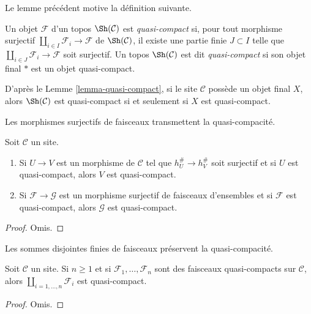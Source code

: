 \noindent
Le lemme précédent motive la définition suivante.

\begin{definition}
\label{definition-quasi-compact-topos}
Un objet $\mathcal{F}$ d’un topos $\Sh(\mathcal{C})$ est {\it quasi-compact}
si, pour tout morphisme surjectif $\coprod_{i \in I} \mathcal{F}_i \to \mathcal{F}$
de $\Sh(\mathcal{C})$, il existe une partie finie $J \subset I$ telle
que $\coprod_{i \in J} \mathcal{F}_i \to \mathcal{F}$ soit surjectif.
Un topos $\Sh(\mathcal{C})$ est dit {\it quasi-compact}
si son objet final $*$ est un objet quasi-compact.
\end{definition}

\noindent
D’après le Lemme \ref{lemma-quasi-compact},
si le site $\mathcal{C}$ possède un objet final $X$, alors
$\Sh(\mathcal{C})$ est quasi-compact si et seulement si $X$ est quasi-compact.

\begin{lemma}
\label{lemma-image-of-quasi-compact}
\begin{slogan}
Les morphismes surjectifs de faisceaux transmettent la quasi-compacité.
\end{slogan}
Soit $\mathcal{C}$ un site.
\begin{enumerate}
\item Si $U \to V$ est un morphisme de $\mathcal{C}$ tel que
$h_U^\# \to h_V^\#$ soit surjectif et si $U$ est quasi-compact, alors
$V$ est quasi-compact.
\item Si $\mathcal{F} \to \mathcal{G}$ est un morphisme surjectif de faisceaux
d’ensembles et si $\mathcal{F}$ est quasi-compact, alors $\mathcal{G}$
est quasi-compact.
\end{enumerate}
\end{lemma}

\begin{proof}
Omis.
\end{proof}

\begin{lemma}
\label{lemma-coproduct-quasi-compact}
\begin{slogan}
Les sommes disjointes finies de faisceaux préservent la quasi-compacité.
\end{slogan}
Soit $\mathcal{C}$ un site. Si $n \geq 1$ et si
$\mathcal{F}_1, \ldots, \mathcal{F}_n$ sont des faisceaux quasi-compacts
sur $\mathcal{C}$, alors $\coprod_{i = 1, \ldots, n} \mathcal{F}_i$
est quasi-compact.
\end{lemma}

\begin{proof}
Omis.
\end{proof}

